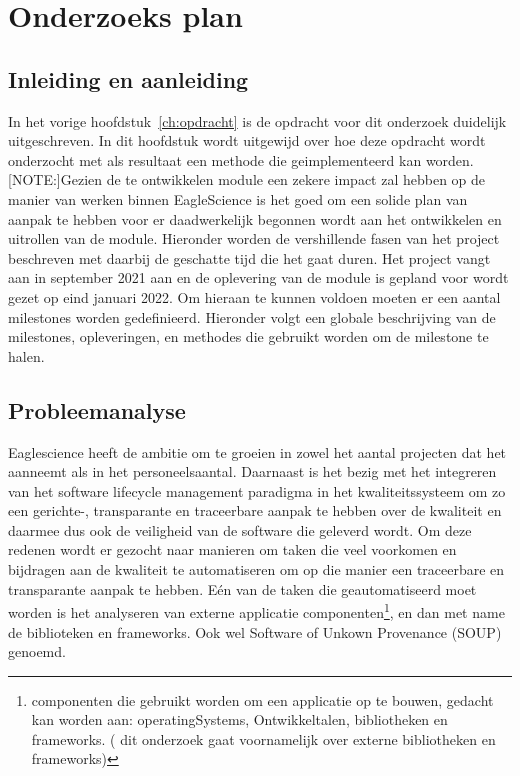 \chapter{Onderzoeks plan}\label{ch:onderzoekPlan}


\section{Inleiding en aanleiding}\label{sec:inleiding-en-aanleiding}%
In het vorige hoofdstuk~\ref{ch:opdracht} is de opdracht voor dit onderzoek duidelijk uitgeschreven. In dit hoofdstuk wordt uitgewijd over hoe deze opdracht wordt onderzocht met als resultaat een methode die geimplementeerd kan worden.
[NOTE:]Gezien de te ontwikkelen module een zekere impact zal hebben op de manier van werken binnen EagleScience is het goed om een solide plan van aanpak te hebben voor er daadwerkelijk begonnen wordt aan het ontwikkelen en uitrollen van de module. Hieronder worden de vershillende fasen van het project beschreven met daarbij de geschatte tijd die het gaat duren. Het project vangt aan in september 2021 aan en de oplevering van de module is gepland voor wordt gezet op eind januari 2022. Om hieraan te kunnen voldoen moeten er een aantal milestones worden gedefinieerd. Hieronder volgt een globale beschrijving van de milestones, opleveringen, en methodes die gebruikt worden om de milestone te halen.


\section{Probleemanalyse}\label{sec:probleemanalyse}
Eaglescience heeft de ambitie om te groeien in zowel het aantal projecten dat het aanneemt als in het personeelsaantal. Daarnaast is het bezig met het integreren van het software lifecycle management paradigma in het kwaliteitssysteem om zo een gerichte-, transparante en traceerbare aanpak te hebben over de kwaliteit en daarmee dus ook de veiligheid van de software die geleverd wordt. Om deze redenen wordt er gezocht naar manieren om taken die veel voorkomen en bijdragen aan de kwaliteit te automatiseren om op die manier een traceerbare en transparante aanpak te hebben. Eén van de taken die geautomatiseerd moet worden is het analyseren van externe applicatie componenten\footnote{componenten die gebruikt worden om een applicatie op te bouwen, gedacht kan worden aan: operatingSystems, Ontwikkeltalen, bibliotheken en frameworks. ( dit onderzoek gaat voornamelijk over externe bibliotheken en frameworks)}, en dan met name de biblioteken en frameworks. Ook wel Software of Unkown Provenance (SOUP) genoemd.

